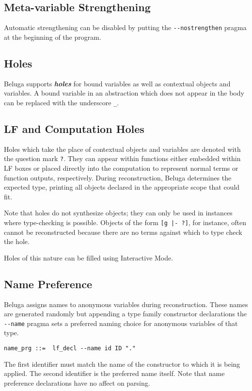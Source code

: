 \documentclass[11pt]{article}
\begin{document}
\subsection{Meta-variable Strengthening}
Automatic strengthening can be disabled by putting the \texttt{-{}-nostrengthen} pragma at the beginning of the program.

\subsection{Holes}
Beluga supports \textit{\textbf{holes}} for bound variables as well as contextual objects and variables. A bound variable in an abstraction which does not appear in the body can be replaced with the underscore \texttt{\_}.

\subsection{LF and Computation Holes}
Holes which take the place of contextual objects and variables are denoted with the question mark \texttt{?}. They can appear within functions either embedded within LF boxes or placed directly into the computation to represent normal terms or function outputs, respectively. During reconstruction, Beluga determines the expected type, printing all objects declared in the appropriate scope that could fit.

Note that holes do not synthesize objects; they can only be used in instances where type-checking is possible. Objects of the form \texttt{[g |- ?]}, for instance, often cannot be reconstructed because there are no terms against which to type check the hole.

Holes of this nature can be filled using Interactive Mode.

\subsection{Name Preference}
Beluga assigns names to anonymous variables during reconstruction. These names are generated randomly but appending a type family constructor declarations the \texttt{-{}-name} pragma sets a preferred naming choice for anonymous variables of that type.
\begin{verbatim}
name_prg ::=  lf_decl --name id ID "."
\end{verbatim}
The first identifier must match the name of the constructor to which it is being applied. The second identifier is the preferred name itself. Note that name preference declarations have no affect on parsing.
\end{document}
